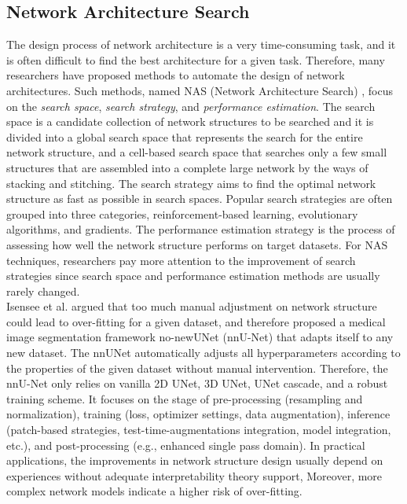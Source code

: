\subsection{Network Architecture Search}
The design process of network architecture is a very time-consuming task, and
it is often difficult to find the best architecture for a given task. Therefore,
many researchers have proposed methods to automate the design of network
architectures. Such methods, named NAS (Network Architecture Search)
\cite{elsken2019nassurvery}, focus on the \emph{search space}, \emph{search
strategy}, and \emph{performance estimation}.
The search space is a candidate collection of network structures to be searched
and it is divided into a global search space that represents the search for the
entire network structure, and a cell-based search space that searches only a few
small structures that are assembled into a complete large network by the ways of
stacking and stitching. The search strategy aims to find the optimal network
structure as fast as possible in search spaces. Popular search strategies are
often grouped into three categories, reinforcement-based learning, evolutionary
algorithms, and gradients. The performance estimation strategy is the process of
assessing how well the network structure performs on target datasets. For NAS
techniques, researchers pay more attention to the improvement of search
strategies since search space and performance estimation methods are usually
rarely changed.\\
Isensee et al. \cite{isensee2018nnu} argued that too much manual adjustment on
network structure could lead to over-fitting for a given dataset, and therefore
proposed a medical image segmentation framework no-newUNet (nnU-Net) that adapts
itself to any new dataset. The nnUNet automatically adjusts all hyperparameters
according to the properties of the given dataset without manual intervention.
Therefore, the nnU-Net only relies on vanilla 2D UNet, 3D UNet, UNet cascade,
and a robust training scheme. It focuses on the stage of pre-processing
(resampling and normalization), training (loss, optimizer settings, data
augmentation), inference (patch-based strategies, test-time-augmentations
integration, model integration, etc.), and post-processing (e.g., enhanced
single pass domain). In practical applications, the improvements in network
structure design usually depend on experiences without adequate interpretability
theory support, Moreover, more complex network models indicate a higher risk of
over-fitting.

